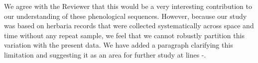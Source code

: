 \documentclass{article}[12pt]
\begin{document}
We agree with the Reviewer that this would be a very interesting contribution to our understanding of these phenological sequences. However, because our study was based on herbaria records that were collected systematically across space and time without any repeat sample, we feel that we cannot robustly partition this variation with the present data. We have added a paragraph clarifying this limitation and suggesting it as an area for further study at lines -.  

 
\end{document}
